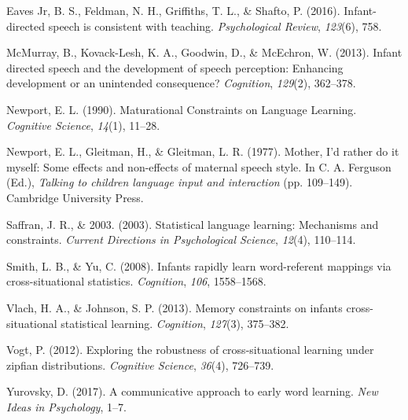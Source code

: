 \documentclass[10pt, letterpaper]{article}
\begin{document}
\hypertarget{ref-eaves-jr2016}{}
Eaves Jr, B. S., Feldman, N. H., Griffiths, T. L., \& Shafto, P. (2016).
Infant-directed speech is consistent with teaching. \emph{Psychological
Review}, \emph{123}(6), 758.

\hypertarget{ref-mcmurray2013}{}
McMurray, B., Kovack-Lesh, K. A., Goodwin, D., \& McEchron, W. (2013).
Infant directed speech and the development of speech perception:
Enhancing development or an unintended consequence? \emph{Cognition},
\emph{129}(2), 362--378.

\hypertarget{ref-newport1990}{}
Newport, E. L. (1990). Maturational Constraints on Language Learning.
\emph{Cognitive Science}, \emph{14}(1), 11--28.

\hypertarget{ref-newport1977}{}
Newport, E. L., Gleitman, H., \& Gleitman, L. R. (1977). Mother, I'd
rather do it myself: Some effects and non-effects of maternal speech
style. In C. A. Ferguson (Ed.), \emph{Talking to children language input
and interaction} (pp. 109--149). Cambridge University Press.

\hypertarget{ref-saffran2003}{}
Saffran, J. R., \& 2003. (2003). Statistical language learning:
Mechanisms and constraints. \emph{Current Directions in Psychological
Science}, \emph{12}(4), 110--114.

\hypertarget{ref-smith2008}{}
Smith, L. B., \& Yu, C. (2008). Infants rapidly learn word-referent
mappings via cross-situational statistics. \emph{Cognition}, \emph{106},
1558--1568.

\hypertarget{ref-vlach2013}{}
Vlach, H. A., \& Johnson, S. P. (2013). Memory constraints on infants
cross-situational statistical learning. \emph{Cognition}, \emph{127}(3),
375--382.

\hypertarget{ref-vogt2012}{}
Vogt, P. (2012). Exploring the robustness of cross-situational learning
under zipfian distributions. \emph{Cognitive Science}, \emph{36}(4),
726--739.

\hypertarget{ref-yurovsky2017}{}
Yurovsky, D. (2017). A communicative approach to early word learning.
\emph{New Ideas in Psychology}, 1--7.
\end{document}

